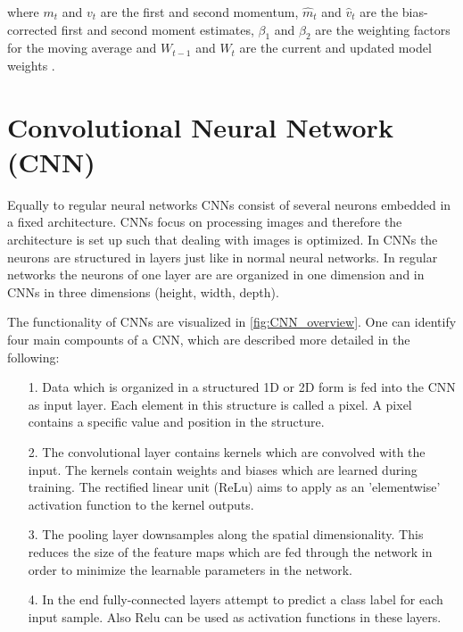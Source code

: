 where $m_{t}$ and $v_{t}$ are the first and second momentum, $\hat{m}_{t}$ and $\hat{v}_{t}$ are the bias-corrected first and second moment estimates, $\beta_{1}$ and $\beta_{2}$ are the weighting factors for the moving average and $W_{t-1}$ and  $W_{t}$ are the current and updated model weights \cite{Ruder2016}.



\section{Convolutional Neural Network (CNN)}

Equally to regular neural networks CNNs consist of several neurons embedded in a fixed architecture. CNNs focus on processing images and therefore the architecture is set up such that dealing with images is optimized. In CNNs the neurons are structured in layers just like in normal neural networks. In regular networks the neurons of one layer are are organized in one dimension and in CNNs in three dimensions (height, width, depth).

The functionality of CNNs are visualized in \ref{fig:CNN_overview}. One can identify four main compounts of a CNN, which are described more detailed in the following:

\begin{itemize}
    \item [1.] Data which is organized in a structured 1D or 2D form is fed into the CNN as input layer. Each element in this structure is called a pixel. A pixel contains a specific value and position in the structure. 
    
    \item [2.] The convolutional layer contains kernels which are convolved with the input. The kernels contain weights and biases which are learned during training. The rectified linear unit (ReLu) aims to apply as an ’elementwise’ activation function to the kernel outputs.
    
    \item [3.] The pooling layer downsamples along the spatial dimensionality. This reduces the size of the feature maps which are fed through the network in order to minimize the learnable parameters in the network.
    
    \item [4.] In the end fully-connected layers attempt to predict a class label for each input sample. Also Relu can be used as activation functions in these layers.
\end{itemize}

